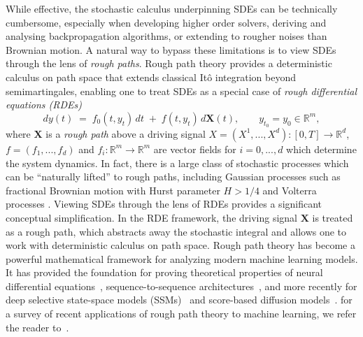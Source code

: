 \documentclass{article} %
\theoremstyle{definition}
\theoremstyle{remark}
\begin{document}
While effective, the stochastic calculus underpinning SDEs can be technically cumbersome, especially when developing higher order solvers, deriving and analysing backpropagation algorithms, or extending to rougher noises than Brownian motion. A natural way to bypass these limitations is to view SDEs through the lens of \emph{rough paths}. Rough path theory \citep{lyons1998differential, gubinelli2004controlling, gubinelli2010ramification} provides a deterministic calculus on path space that extends classical It\^o integration beyond semimartingales, enabling one to treat SDEs as a special case of \emph{rough differential equations (RDEs)}
\begin{equation}\label{eqn:rde}
dy(t) \;=\; f_0(t, y_t)\,dt \;+\; f(t, y_t)\,d\mathbf{X}(t), 
\qquad y_{t_0} = y_0 \in \mathbb{R}^m,
\end{equation}
where $\mathbf{X}$ is a \emph{rough path} above a driving signal $X = (X^1,...,X^d) : [0,T] \to \mathbb{R}^d$, $f = (f_1,...,f_d)$ and $f_i : \mathbb{R}^m \to \mathbb{R}^m$ are  vector fields for $i=0,...,d$ which determine the system dynamics. In fact, there is a large class of stochastic processes which can be “naturally lifted” to rough paths, including Gaussian processes such as fractional Brownian motion with Hurst parameter $H > 1/4$ and Volterra processes \citep{friz2010multidimensional}. Viewing SDEs through the lens of RDEs provides a significant conceptual simplification. In the RDE framework, the driving signal $\mathbf{X}$ is treated as a rough path, which abstracts away the stochastic integral and allows one to work with deterministic calculus on path space. Rough path theory has become a powerful mathematical framework for analyzing modern machine learning models. It has provided the foundation for proving theoretical properties of neural differential equations~\citep{morrill2021neural, arribas2020sigsdes, cirone2023neural, holberg2024exact}, sequence-to-sequence architectures~\citep{kidger2019deep}, and more recently for deep selective state-space models (SSMs)~\citep{cirone2024theoretical, cirone2025parallelflow, walker2025structured} and score-based diffusion models~\citep{barancikovasigdiffusions}. for a survey of recent applications of rough path theory to machine learning, we refer the reader  to~\citep{fermanian2023new}.
\end{document}
